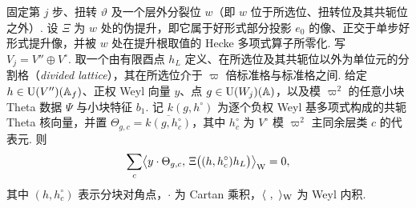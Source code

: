 \begin{lemma}
\label{lem:c-false-slice}
\emitthmsource
固定第 $j$ 步、扭转 $\vartheta$ 及一个层外分裂位 $w$（即 $w$ 位于所选位、扭转位及其共轭位之外）. 设 $\Xi$ 为 $w$ 处的伪提升，即它属于好形式部分投影 $e_0$ 的像、正交于单步好形式提升像，并被 $w$ 处在提升根取值的 Hecke 多项式算子所零化.
写 $V_j=V''\oplus V^\circ$. 取一个由有限酉点 $h_L$ 定义、在所选位及其共轭位以外为单位元的分割格（\emph{divided lattice}），其在所选位介于 $\varpi$ 倍标准格与标准格之间. 给定 $h\in \operatorname{U}(V'')(\mathbb A_f)$、正权 Weyl 向量 $y$、点 $g\in \operatorname{U}(W_j)(\mathbb A)$，以及模 $\varpi^2$ 的任意小块 Theta 数据 $\Psi$ 与小块特征 $b_1$. 记 $k(g,h^\circ)$ 为逐个负权 Weyl 基多项式构成的共轭 Theta 核向量，并置 $\Theta_{g,c}=\overline{k(g,h_c^\circ)}$，其中 $h_c^\circ$ 为 $V^\circ$ 模 $\varpi^2$ 主同余层类 $c$ 的代表元. 则
\[
 \sum_c
 \bigl\langle y\cdot\Theta_{g,c},\,
      \Xi\bigl((h,h_c^\circ)h_L\bigr)\bigr\rangle_{\rm W}=0 ,
\]
其中 $(h,h_c^\circ)$ 表示分块对角点，$\cdot$ 为 Cartan 乘积，$\langle\ ,\ \rangle_{\rm W}$ 为 Weyl 内积.
\end{lemma}

